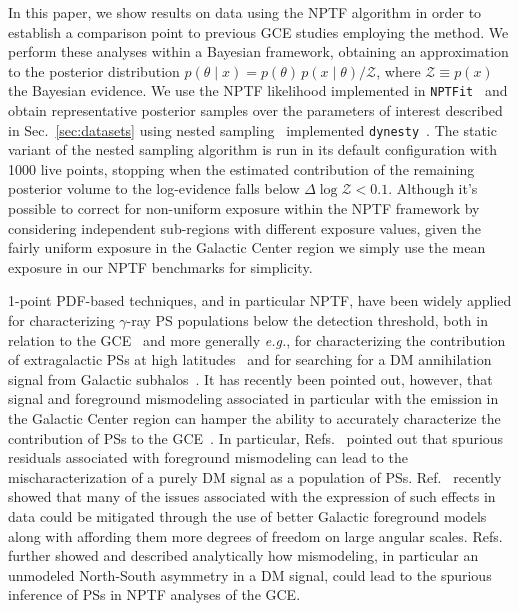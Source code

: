 \documentclass[prd,aps,10pt,nofootinbib,twocolumn,superscriptaddress,preprintnumbers,balancelastpage,longbibliography]{revtex4-1}
\begin{document}
In this paper, we show results on \Fermi data using the NPTF algorithm in order to establish a comparison point to previous GCE studies employing the method. We perform these analyses within a Bayesian framework, obtaining an approximation to the posterior distribution $p(\theta\mid x) = p(\theta)\, p(x\mid\theta) / \mathcal Z$, where $\mathcal Z \equiv p(x)$ the Bayesian evidence. 
We use the NPTF likelihood implemented in \texttt{NPTFit}~\cite{Mishra-Sharma:2016gis} and obtain representative posterior samples over the parameters of interest described in Sec.~\ref{sec:datasets} using nested sampling~\cite{Feroz:2013hea,skilling2006} implemented \texttt{dynesty}~\cite{Speagle_2020}. The static variant of the nested sampling algorithm is run in its default configuration with 1000 live points, stopping when the estimated contribution of the remaining posterior volume to the log-evidence falls below $\Delta \log \mathcal Z < 0.1$. Although it's possible to correct for non-uniform exposure within the NPTF framework by considering independent sub-regions with different exposure values, given the fairly uniform \Fermi exposure in the Galactic Center region we simply use the mean exposure in our NPTF benchmarks for simplicity.

1-point PDF-based techniques, and in particular NPTF, have been widely applied for characterizing $\gamma$-ray PS populations below the \Fermi detection threshold, both in relation to the GCE~\cite{Lee:2015fea,Leane:2020pfc,Leane:2020nmi,Buschmann:2020adf,Calore:2021bty} and more generally \emph{e.g.}, for characterizing the contribution of extragalactic PSs at high latitudes~\cite{Lisanti:2016jub,Zechlin:2016pme,Zechlin:2015wdz} and for searching for a DM annihilation signal from Galactic subhalos~\cite{Somalwar:2020awt}. It has recently been pointed out, however, that signal and foreground mismodeling associated in particular with the emission in the Galactic Center region can hamper the ability to accurately characterize the contribution of PSs to the GCE~\cite{Leane:2019xiy,Leane:2020pfc}. In particular, Refs.~\cite{Lee:2015fea,Leane:2019xiy,Chang:2019ars} pointed out that spurious residuals associated with foreground mismodeling can lead to the mischaracterization of a purely DM signal as a population of PSs. Ref.~\cite{Buschmann:2020adf} recently showed that many of the issues associated with the expression of such effects in \Fermi data could be mitigated through the use of better Galactic foreground models along with affording them more degrees of freedom on large angular scales.
Refs.~\cite{Leane:2020pfc,Leane:2020nmi} further showed and described analytically how mismodeling, in particular an unmodeled North-South asymmetry in a DM signal, could lead to the spurious inference of PSs in NPTF analyses of the GCE. %
\end{document}
